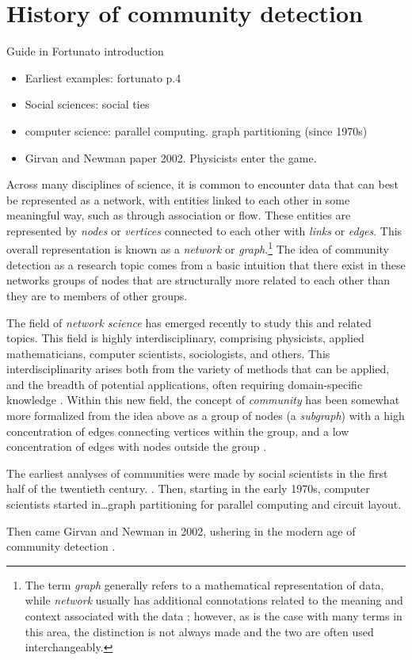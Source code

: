 \section{History of community
detection}\label{history-of-community-detection}

Guide in Fortunato introduction

\begin{itemize}
\tightlist
\item
  Earliest examples: fortunato p.4
\item
  Social sciences: social ties
\item
  computer science: parallel computing. graph partitioning (since 1970s)
\item
  Girvan and Newman paper 2002. Physicists enter the game.
\end{itemize}

Across many disciplines of science, it is common to encounter data that
can best be represented as a network, with entities linked to each other
in some meaningful way, such as through association or flow. These
entities are represented by \emph{nodes} or \emph{vertices} connected to
each other with \emph{links} or \emph{edges}. This overall
representation is known as a \emph{network} or \emph{graph}.\footnote{The
  term \emph{graph} generally refers to a mathematical representation of
  data, while \emph{network} usually has additional connotations related
  to the meaning and context associated with the data
  \autocite{porter_communities_2009}; however, as is the case with many
  terms in this area, the distinction is not always made and the two are
  often used interchangeably.} The idea of community detection as a
research topic comes from a basic intuition that there exist in these
networks groups of nodes that are structurally more related to each
other than they are to members of other groups.

The field of \emph{network science} has emerged recently to study this
and related topics. This field is highly interdisciplinary, comprising
physicists, applied mathematicians, computer scientists, sociologists,
and others. This interdisciplinarity arises both from the variety of
methods that can be applied, and the breadth of potential applications,
often requiring domain-specific knowledge
\autocite{porter_communities_2009}. Within this new field, the concept
of \emph{community} has been somewhat more formalized from the idea
above as a group of nodes (a \emph{subgraph}) with a high concentration
of edges connecting vertices within the group, and a low concentration
of edges with nodes outside the group
\autocite{fortunato_community_2010}.

The earliest analyses of communities were made by social scientists in
the first half of the twentieth century. . Then, starting
in the early 1970s, computer scientists started in\ldots{}graph
partitioning for parallel computing and circuit layout.

Then came Girvan and Newman in 2002, ushering in the modern age of
community detection \autocite{lancichinetti_community_2009}.

